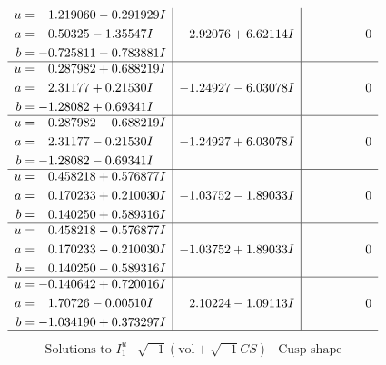 \documentclass[1p]{elsarticle_modified}
\theoremstyle{definition}
\newcommand{\I}{\sqrt{-1}}
\begin{document}
$$\begin{array}{c|c|c}
\begin{aligned}
u &= \phantom{-}1.219060 - 0.291929 I \\
a &= \phantom{-}0.50325 - 1.35547 I \\
b &= -0.725811 - 0.783881 I\end{aligned}
 & -2.92076 + 6.62114 I & \phantom{-0.000000 } 0 \\ \hline\begin{aligned}
u &= \phantom{-}0.287982 + 0.688219 I \\
a &= \phantom{-}2.31177 + 0.21530 I \\
b &= -1.28082 + 0.69341 I\end{aligned}
 & -1.24927 - 6.03078 I & \phantom{-0.000000 } 0 \\ \hline\begin{aligned}
u &= \phantom{-}0.287982 - 0.688219 I \\
a &= \phantom{-}2.31177 - 0.21530 I \\
b &= -1.28082 - 0.69341 I\end{aligned}
 & -1.24927 + 6.03078 I & \phantom{-0.000000 } 0 \\ \hline\begin{aligned}
u &= \phantom{-}0.458218 + 0.576877 I \\
a &= \phantom{-}0.170233 + 0.210030 I \\
b &= \phantom{-}0.140250 + 0.589316 I\end{aligned}
 & -1.03752 - 1.89033 I & \phantom{-0.000000 } 0 \\ \hline\begin{aligned}
u &= \phantom{-}0.458218 - 0.576877 I \\
a &= \phantom{-}0.170233 - 0.210030 I \\
b &= \phantom{-}0.140250 - 0.589316 I\end{aligned}
 & -1.03752 + 1.89033 I & \phantom{-0.000000 } 0 \\ \hline\begin{aligned}
u &= -0.140642 + 0.720016 I \\
a &= \phantom{-}1.70726 - 0.00510 I \\
b &= -1.034190 + 0.373297 I\end{aligned}
 & \phantom{-}2.10224 - 1.09113 I & \phantom{-0.000000 } 0\\
 \hline 
 \end{array}$$\newpage$$\begin{array}{c|c|c}  
\text{Solutions to }I^u_{1}& \I (\text{vol} + \sqrt{-1}CS) & \text{Cusp shape}\\
 \hline 
\begin{aligned}

\end{aligned}
\end{array}$$
\end{document}
